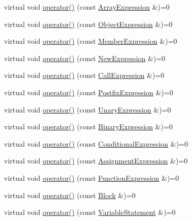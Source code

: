 \begin{DoxyCompactItemize}
\item 
virtual void \hyperlink{struct_visitor_a99d582c067b225f1022a27c44beb801c}{operator()} (const \hyperlink{struct_array_expression}{Array\+Expression} \&)=0
\item 
virtual void \hyperlink{struct_visitor_a58d0e4e708057211465ba14290a0a154}{operator()} (const \hyperlink{struct_object_expression}{Object\+Expression} \&)=0
\item 
virtual void \hyperlink{struct_visitor_a175fd29619240cc378703de4c357f348}{operator()} (const \hyperlink{struct_member_expression}{Member\+Expression} \&)=0
\item 
virtual void \hyperlink{struct_visitor_a13ead8d5ef82f284e301ba8127e9fb56}{operator()} (const \hyperlink{struct_new_expression}{New\+Expression} \&)=0
\item 
virtual void \hyperlink{struct_visitor_aa6152c6f355690fd1c4db37fff303614}{operator()} (const \hyperlink{struct_call_expression}{Call\+Expression} \&)=0
\item 
virtual void \hyperlink{struct_visitor_acd630c29940c6785726ce51c7db0aab9}{operator()} (const \hyperlink{struct_postfix_expression}{Postfix\+Expression} \&)=0
\item 
virtual void \hyperlink{struct_visitor_ad2e06814dadca4469f4036ba9a00afd7}{operator()} (const \hyperlink{struct_unary_expression}{Unary\+Expression} \&)=0
\item 
virtual void \hyperlink{struct_visitor_a6132b5969ec220e7c98af3a957f48a0e}{operator()} (const \hyperlink{struct_binary_expression}{Binary\+Expression} \&)=0
\item 
virtual void \hyperlink{struct_visitor_a132fc5e3ff45efb2869272fbe5d5f815}{operator()} (const \hyperlink{struct_conditional_expression}{Conditional\+Expression} \&)=0
\item 
virtual void \hyperlink{struct_visitor_a59484106e31788e00bf479636d6b6994}{operator()} (const \hyperlink{struct_assignment_expression}{Assignment\+Expression} \&)=0
\item 
virtual void \hyperlink{struct_visitor_a3f6eb67942d7e2c83a761de2bd66a60a}{operator()} (const \hyperlink{struct_function_expression}{Function\+Expression} \&)=0
\item 
virtual void \hyperlink{struct_visitor_a3a26b45c1ab418661f992d97ed9ec9f0}{operator()} (const \hyperlink{struct_block}{Block} \&)=0
\item 
virtual void \hyperlink{struct_visitor_accbed2e228126d93b162df7bb44bb3c8}{operator()} (const \hyperlink{struct_variable_statement}{Variable\+Statement} \&)=0

\end{DoxyCompactItemize}

